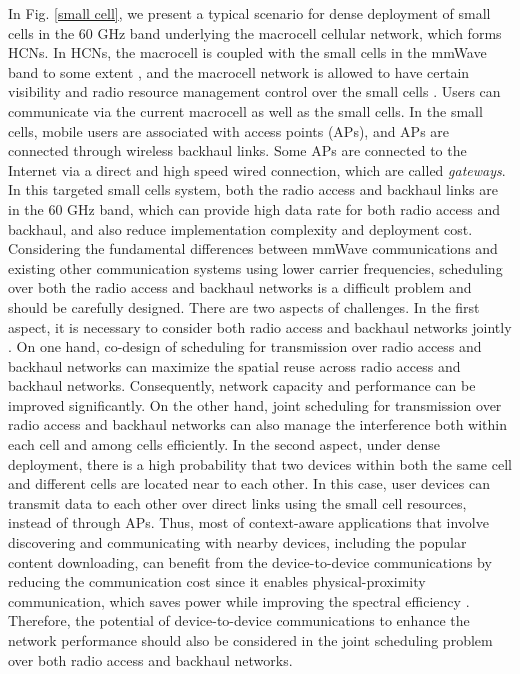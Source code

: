 \documentclass[journal]{IEEEtran}
\begin{document}
In Fig. \ref{small cell}, we present a typical scenario for dense deployment of small cells in the
60 GHz band underlying the macrocell cellular network, which forms HCNs. In HCNs, the macrocell is coupled with the small cells in the mmWave band to some extent \cite{hybrid 4G}, and the macrocell network is allowed to have certain visibility and radio resource management control over the small cells \cite{HCN_book}. Users can communicate via the current macrocell as well as the small cells. In the small cells, mobile
users are associated with access points (APs), and APs are connected through wireless backhaul
links. Some APs are connected to the Internet via a direct and high speed wired connection, which
are called \emph{gateways}. In this targeted small cells system, both the radio access and backhaul
links are in the 60 GHz band, which can provide high data rate for both radio access and backhaul,
and also reduce implementation complexity and deployment cost. Considering the fundamental
differences between mmWave communications and existing other communication systems using lower
carrier frequencies, scheduling over both the radio access and backhaul networks is a difficult
problem and should be carefully designed. There are two aspects of challenges. In the first aspect,
it is necessary to consider both radio access and backhaul networks jointly \cite{joint_design}. On
one hand, co-design of scheduling for transmission over radio access and backhaul networks can
maximize the spatial reuse across radio access and backhaul networks. Consequently, network
capacity and performance can be improved significantly. On the other hand, joint scheduling for
transmission over radio access and backhaul networks can also manage the interference both within
each cell and among cells efficiently. In the second aspect, under dense deployment, there is a
high probability that two devices within both the same cell and different cells are located near to
each other. In this case, user devices can transmit data to each other over direct links using the
small cell resources, instead of through APs. Thus, most of context-aware applications that involve
discovering and communicating with nearby devices, including the popular content downloading, can
benefit from the device-to-device communications by reducing the communication cost since it
enables physical-proximity communication, which saves power while improving the spectral
efficiency \cite{hua1}. Therefore, the potential of device-to-device communications to enhance the network
performance should also be considered in the joint scheduling problem over both radio access and
backhaul networks.
\end{document}
